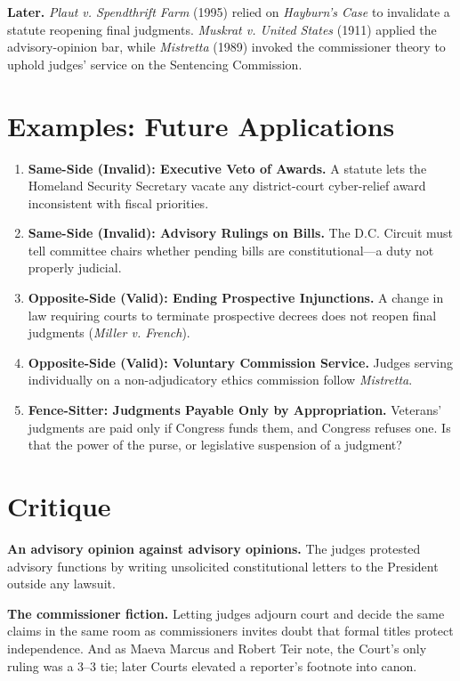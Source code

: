 \documentclass[12pt]{article}
\begin{document}
\textbf{Later.} \textit{Plaut v. Spendthrift Farm} (1995) relied on \textit{Hayburn's Case} to invalidate a statute reopening final judgments. \textit{Muskrat v. United States} (1911) applied the advisory-opinion bar, while \textit{Mistretta} (1989) invoked the commissioner theory to uphold judges' service on the Sentencing Commission.

\section{Examples: Future Applications}

\begin{enumerate}
\item \textbf{Same-Side (Invalid): Executive Veto of Awards.} A statute lets the Homeland Security Secretary vacate any district-court cyber-relief award inconsistent with fiscal priorities.
\item \textbf{Same-Side (Invalid): Advisory Rulings on Bills.} The D.C. Circuit must tell committee chairs whether pending bills are constitutional---a duty not properly judicial.
\item \textbf{Opposite-Side (Valid): Ending Prospective Injunctions.} A change in law requiring courts to terminate prospective decrees does not reopen final judgments (\textit{Miller v. French}).
\item \textbf{Opposite-Side (Valid): Voluntary Commission Service.} Judges serving individually on a non-adjudicatory ethics commission follow \textit{Mistretta}.
\item \textbf{Fence-Sitter: Judgments Payable Only by Appropriation.} Veterans' judgments are paid only if Congress funds them, and Congress refuses one. Is that the power of the purse, or legislative suspension of a judgment?
\end{enumerate}

\section{Critique}

\textbf{An advisory opinion against advisory opinions.} The judges protested advisory functions by writing unsolicited constitutional letters to the President outside any lawsuit.

\textbf{The commissioner fiction.} Letting judges adjourn court and decide the same claims in the same room as commissioners invites doubt that formal titles protect independence. And as Maeva Marcus and Robert Teir note, the Court's only ruling was a 3--3 tie; later Courts elevated a reporter's footnote into canon.
\end{document}
